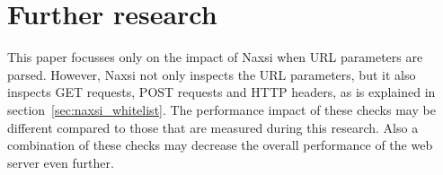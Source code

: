 \documentclass[Further research]{subfiles}
\begin{document}
\section{Further research}
\label{sec:Further research}

This paper focusses only on the impact of Naxsi when \ac{URL} parameters are parsed. However, Naxsi not only inspects the \ac{URL} parameters, but it also inspects GET requests, POST requests and HTTP headers, as is explained in section~\ref{sec:naxsi_whitelist}. The performance impact of these checks may be different compared to those that are measured during this research. Also a combination of these checks may decrease the overall performance of the web server even further.
\end{document}
